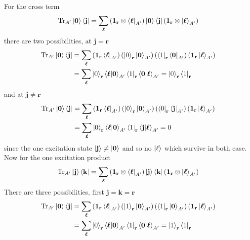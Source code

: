 \documentclass[../../../main.tex]{subfiles}
\begin{document}
For the cross term
\begin{equation*}
  \mathrm{Tr} _{A'} \ket{\mathbf{0}}\bra{\mathbf{j}}
  = \sum_{\boldsymbol{\ell}} \left( \mathbf{1 }_\mathbf{r}\otimes\bra{\boldsymbol{\ell}}_{A'} \right)\ket{\mathbf{0}}\bra{\mathbf{j}} \left( \mathbf{1 }_\mathbf{r}\otimes\ket{\boldsymbol{\ell}}_{A'} \right)
\end{equation*}
there are two possibilities, at $\mathbf{j} = \mathbf{r}$
\begin{align*}
  \mathrm{Tr} _{A'} \ket{\mathbf{0}}\bra{\mathbf{j}}
   & =  \sum_{\boldsymbol{\ell}} \left( \mathbf{1 }_\mathbf{r} \bra{\boldsymbol{\ell}}_{A'} \right)\left(\ket{0}_\mathbf{r} \ket{\mathbf{0}}_{A'} \right) \left( \bra{{1}}_\mathbf{r}  \bra{\mathbf{0}}_{A'}\right)  \left( \mathbf{1 }_\mathbf{r} \ket{\boldsymbol{\ell}}_{A'} \right) \\
   & = \sum_{\boldsymbol{\ell}}  \ket{0}_\mathbf{r} \braket{\boldsymbol{\ell  }  |\mathbf{0} }_{A'} \bra{1}_\mathbf{r} \braket{\mathbf{0 } | \boldsymbol{\ell }}_{A'}
  = \ket{0}_\mathbf{r} \bra{1}_\mathbf{r}
\end{align*}
and at $\mathbf{j} \neq \mathbf{r}$
\begin{align*}
  \mathrm{Tr} _{A'} \ket{\mathbf{0}}\bra{\mathbf{j}}
   & =  \sum_{\boldsymbol{\ell}} \left( \mathbf{1 }_\mathbf{r} \bra{\boldsymbol{\ell}}_{A'} \right)\left(\ket{0}_\mathbf{r} \ket{\mathbf{0}}_{A'} \right) \left( \bra{{0}}_\mathbf{r}  \bra{\mathbf{j}}_{A'}\right)  \left( \mathbf{1 }_\mathbf{r} \ket{\boldsymbol{\ell}}_{A'} \right) \\
   & = \sum_{\boldsymbol{\ell}}  \ket{0}_\mathbf{r} \braket{\boldsymbol{\ell  }  |\mathbf{0} }_{A'} \bra{1}_\mathbf{r} \braket{\mathbf{j } | \boldsymbol{\ell }}_{A'}
  = 0
\end{align*}
since  the one excitation state $\ket{\mathbf{j}} \neq \ket{\mathbf{0}}$ and so no $\ket{\mathbf{\ell }}$ which survive in both case.
Now for the one excitation product
\begin{equation*}
  \mathrm{Tr} _{A'} \ket{\mathbf{j}}\bra{\mathbf{k}}
  = \sum_{\boldsymbol{\ell}} \left( \mathbf{1 }_\mathbf{r}\otimes\bra{\boldsymbol{\ell}}_{A'} \right)\ket{\mathbf{j}}\bra{\mathbf{k}} \left( \mathbf{1 }_\mathbf{r}\otimes\ket{\boldsymbol{\ell}}_{A'} \right)
\end{equation*}
There are three possibilities, first $\mathbf{j} = \mathbf{k} = \mathbf{r}$
\begin{align*}
  \mathrm{Tr} _{A'} \ket{\mathbf{0}}\bra{\mathbf{j}}
   & =  \sum_{\boldsymbol{\ell}} \left( \mathbf{1 }_\mathbf{r} \bra{\boldsymbol{\ell}}_{A'} \right)\left(\ket{1}_\mathbf{r} \ket{\mathbf{0}}_{A'} \right) \left( \bra{{1}}_\mathbf{r}  \ket{\mathbf{0}}_{A'}\right)  \left( \mathbf{1 }_\mathbf{r} \ket{\boldsymbol{\ell}}_{A'} \right) \\
   & = \sum_{\boldsymbol{\ell}}  \ket{0}_\mathbf{r} \braket{\boldsymbol{\ell  }  |\mathbf{0} }_{A'} \bra{1}_\mathbf{r} \braket{\mathbf{0 } | \boldsymbol{\ell }}_{A'}
  = \ket{1}_\mathbf{r} \bra{1}_\mathbf{r}
\end{align*}
\end{document}
